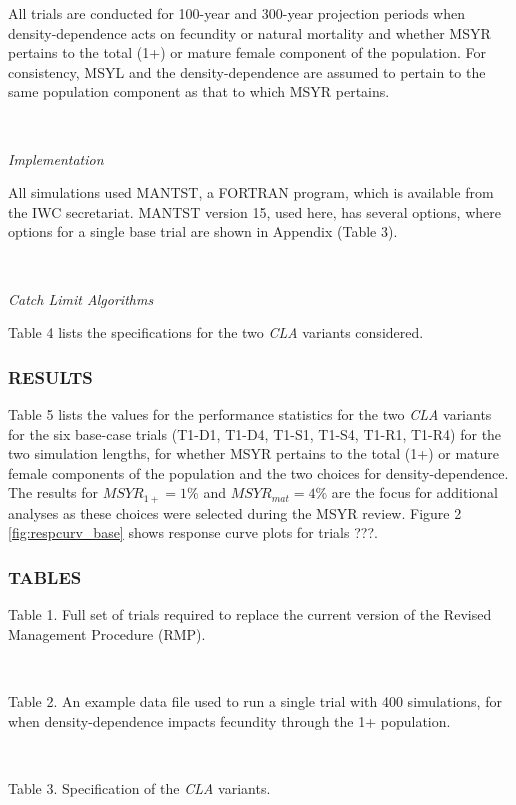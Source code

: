 \documentclass[]{article}
\begin{document}
All trials are conducted for 100-year and 300-year projection periods
when density-dependence acts on fecundity or natural mortality
\autocite{johnson_2015_iwc1} and whether MSYR pertains to the total (1+)
or mature female component of the population. For consistency, MSYL and
the density-dependence are assumed to pertain to the same population
component as that to which MSYR pertains.

~

\emph{Implementation}

All simulations used MANTST, a FORTRAN program, which is available from
the IWC secretariat. MANTST version 15, used here, has several options,
where options for a single base trial are shown in Appendix (Table 3).

~

\emph{Catch Limit Algorithms}

Table 4 lists the specifications for the two \emph{CLA} variants
considered.

\subsubsection{RESULTS}\label{results}

Table 5 lists the values for the performance statistics for the two
\emph{CLA} variants for the six base-case trials (T1-D1, T1-D4, T1-S1,
T1-S4, T1-R1, T1-R4) for the two simulation lengths, for whether MSYR
pertains to the total (1+) or mature female components of the population
and the two choices for density-dependence. The results for
$MSYR_{1+}=1\%$ and $MSYR_{mat}=4\%$ are the focus for additional
analyses as these choices were selected during the MSYR review.
Figure 2 \ref{fig:respcurv_base} shows response curve plots for trials ???.

\subsubsection{TABLES}\label{tables}
Table 1. Full set of trials required to replace the current version of
the Revised Management Procedure (RMP).


~

Table 2. An example data file used to run a single trial with 400 simulations,
for when density-dependence impacts fecundity through the 1+ population.


~

Table 3. Specification of the \emph{CLA} variants.

\end{document}
